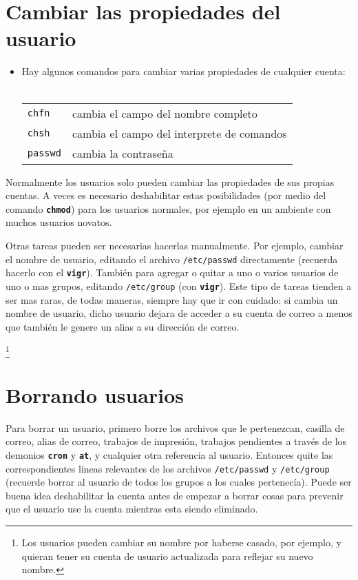 \documentclass[12pt]{article}
\begin{document}
 \section{ Cambiar las propiedades del usuario}

\begin{itemize}
	\item Hay algunos comandos para cambiar varias propiedades de cualquier cuenta: \\ \\
\begin{tabular}{ l l }
	\texttt{chfn} & cambia el campo del nombre completo \\
	\texttt{chsh} & cambia el campo del interprete de comandos \\
	\texttt{passwd} & cambia la contraseña \\
\end{tabular}
\end{itemize}


Normalmente los usuarios solo pueden cambiar las propiedades de sus propias
cuentas. A veces es necesario deshabilitar estas posibilidades (por medio del
comando \texttt{\textbf{chmod}})  para los usuarios normales, por ejemplo en un
ambiente con muchos usuarios novatos.

Otras tareas pueden ser necesarias hacerlas manualmente. Por ejemplo,
cambiar el nombre de usuario, editando el archivo
\texttt{/etc/passwd} directamente (recuerda hacerlo con el
\texttt{\textbf{vigr}}). También para agregar o quitar a uno o varios usuarios
de uno o mas grupos, editando \texttt{/etc/group} (con
\texttt{\textbf{vigr}}). Este tipo de tareas tienden a ser mas raras, de todas
maneras, siempre hay que ir con cuidado: si cambia un nombre de usuario, dicho
usuario dejara de acceder a su cuenta de correo a menos que también le genere un
alias a su dirección de correo.
	
		\footnote{Los usuarios pueden cambiar su
		nombre por haberse casado, por ejemplo, y quieran tener su cuenta de usuario
		actualizada para reflejar su nuevo nombre.}
		









\section{Borrando usuarios}

Para borrar un usuario, primero borre los archivos que le pertenezcan,
casilla de correo, alias de correo, trabajos de impresión, trabajos pendientes a
través de los demonios \texttt{\textbf{cron}} y \texttt{\textbf{at}}, y
cualquier otra referencia al usuario.  Entonces quite las correspondientes
lineas relevantes de los archivos \texttt{/etc/passwd} y
\texttt{/etc/group}	 (recuerde borrar al usuario de todos los grupos
a los cuales pertenecía).  Puede ser buena idea deshabilitar la cuenta antes de
empezar a borrar cosas para prevenir que el usuario use la cuenta mientras esta
siendo eliminado.
\end{document}
